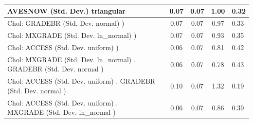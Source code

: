 \begin{table}
\begin{center}
\begin{tabular}{|l|l|c|c|c|l|}
			\hline
			AVESNOW (Std. Dev.) triangular &  & 0.07 & 0.07 & 1.00 & 0.32 \\
			\hline
			 Chol: GRADEBR (Std. Dev. normal) ) &  & 0.07 & 0.07 & 0.97 & 0.33 \\
			\hline
			 Chol: MXGRADE (Std. Dev. ln_normal) ) &  & 0.07 & 0.07 & 0.93 & 0.35 \\
			\hline
			 Chol: ACCESS (Std. Dev. uniform) ) &  & 0.06 & 0.07 & 0.81 & 0.42 \\
			\hline
			 Chol: MXGRADE (Std. Dev. ln_normal) . GRADEBR (Std. Dev.   normal ) &  & 0.06 & 0.07 & 0.78 & 0.43 \\
			\hline
			 Chol: ACCESS (Std. Dev. uniform) . GRADEBR (Std. Dev.   normal ) &  & 0.10 & 0.07 & 1.32 & 0.19 \\
			\hline
			 Chol: ACCESS (Std. Dev. uniform) . MXGRADE (Std. Dev.   ln_normal ) &  & 0.06 & 0.07 & 0.86 & 0.39 \\
			\hline
		\end{tabular}
	\end{center}
\end{table}